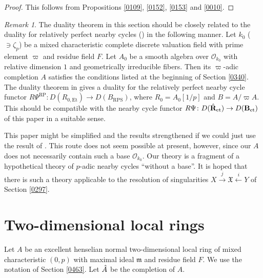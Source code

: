 \documentclass{amsart}
\theoremstyle{remark}
\newtheorem{Rmk}[Thm]{Remark}
\numberwithin{equation}{subsection}
\newcommand{\Order}{\mathcal{O}}
\newcommand{\et}{\mathrm{et}}
\newcommand{\Et}{\mathrm{Et}}
\newcommand{\alg}[1]{\mathbf{#1}}
\newcommand{\ideal}[1]{\mathfrak{#1}}
\begin{document}
\begin{proof}
	This follows from Propositions \ref{0109}, \ref{0152}, \ref{0153} and \ref{0010}.
\end{proof}

\begin{Rmk}
	The duality theorem in this section should be closely related to
	the duality for relatively perfect nearby cycles (\cite{KS19}) in the following manner.
	Let $k_{0}$ ($\ni \zeta_{p}$) be a mixed characteristic complete discrete valuation field
	with prime element $\varpi$ and residue field $F$.
	Let $A_{0}$ be a smooth algebra over $\Order_{k_{0}}$ with relative dimension $1$
	and geometrically irreducible fibers.
	Then its $\varpi$-adic completion $A$ satisfies
	the conditions listed at the beginning of Section \ref{0340}.
	The duality theorem in \cite{KS19} gives a duality for
	the relatively perfect nearby cycle functor
	$R \Psi^{\mathrm{RP}} \colon D(R_{0, \Et}) \to D(B_{\mathrm{RPS}})$,
	where $R_{0} = A_{0}[1 / p]$ and $B = A / \varpi A$.
	This should be compatible with the nearby cycle functor
	$R \Psi \colon D(\Hat{\alg{R}}_{\et}) \to D(\alg{B}_{\et})$ of this paper
	in a suitable sense.
	
	This paper might be simplified and
	the results strengthened if we could just use the result of \cite{KS19}.
	This route does not seem possible at present, however,
	since our $A$ does not necessarily contain such a base $\Order_{k_{0}}$.
	Our theory is a fragment of a hypothetical theory of
	$p$-adic nearby cycles ``without a base''.
	It is hoped that there is such a theory applicable to the resolution of singularities
	$X \stackrel{j}{\to} \mathfrak{X} \stackrel{i}{\gets} Y$ of Section \ref{0297}.
\end{Rmk}


\section{Two-dimensional local rings}
\label{0277}

Let $A$ be an excellent henselian normal two-dimensional local ring of mixed characteristic $(0, p)$
with maximal ideal $\ideal{m}$ and residue field $F$.
We use the notation of Section \ref{0463}.
Let $\Hat{A}$ be the completion of $A$.
\end{document}
